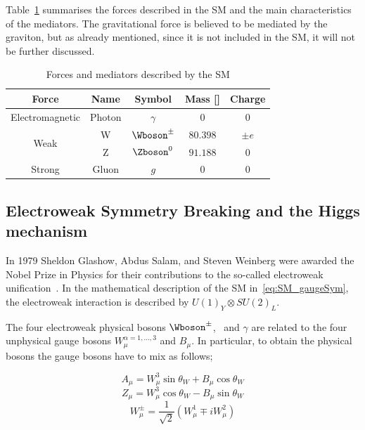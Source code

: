 			Table~\ref{tab:interactions} summarises the forces described in the \ac{SM} and the main characteristics of the mediators. The gravitational force is believed to be mediated by the graviton, but as already mentioned, since it is not included in the \ac{SM}, it will not be further discussed.

			\begin{table}[!htb]\centering\caption{Forces and mediators described by the \ac{SM}}							
				\begin{tabular}{ccccc}
					\toprule
					\textbf{Force} & \textbf{Name} & \textbf{Symbol} & \textbf{Mass} [\GeV]& \textbf{Charge} \\ 
					\toprule
					Electromagnetic & Photon & $\gamma$ & 0 & 0 \\ \midrule
					\multirow{2}{*}{Weak} & W & $\Wboson^{\pm}$ & $80.398$ & $\pm e$ \\
					& Z & $\Zboson^0$ & $91.188$ & 0 \\\midrule
					Strong & Gluon & $g$ & $0$ & $0$ \\\bottomrule
				\end{tabular}						
			\label{tab:interactions} 
			\end{table}


		\subsection{Electroweak Symmetry Breaking and the Higgs mechanism}
		\label{sec:ewksb}

			In 1979 Sheldon Glashow, Abdus Salam, and Steven Weinberg were awarded the Nobel Prize in Physics for their contributions to the so-called electroweak unification~\cite{Glashow:1961tr,SALAM1964168,PhysRevLett.19.1264}. In the mathematical description of the \ac{SM} in~\ref{eq:SM_gaugeSym}, the electroweak interaction is described by $U(1)_Y \otimes SU(2)_L$. 

			The four electroweak physical bosons $\Wboson^{\pm}$, \Zboson\ and $\gamma$ are related to the four unphysical gauge bosons $W_{\mu}^{\alpha = 1,\dots,3}$ and $B_\mu$. In particular, to obtain the physical bosons the gauge bosons have to mix as follows;

			\begin{equation}
			\label{eq:photon}
				A_{\mu} = W_{\mu}^3 \sin\theta_W  + B_{\mu}\cos \theta_W 
			\end{equation}
			\begin{equation}
			\label{eq:Zboson}
				Z_{\mu} = W_{\mu}^3\cos\theta_W  - B_{\mu} \sin \theta_W
			\end{equation}
			\begin{equation}
			\label{eq:Wboson}
				W_{\mu}^\pm = \frac{1}{\sqrt{2}} \displaystyle \left ( W_{\mu}^1 \mp i W_{\mu}^2 \right )
			\end{equation}

